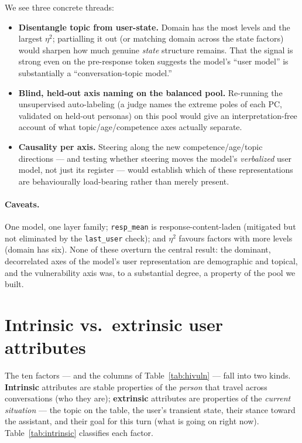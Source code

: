 \documentclass[11pt]{article}
\newcommand{\resp}{\texttt{resp\_mean}}
\newcommand{\lastu}{\texttt{last\_user}}
\begin{document}
We see three concrete threads:
\begin{itemize}\itemsep2pt
\item \textbf{Disentangle topic from user-state.} Domain has the most levels and
the largest $\eta^2$; partialling it out (or matching domain across the state
factors) would sharpen how much genuine \emph{state} structure remains. That the
signal is strong even on the pre-response token suggests the model's ``user model''
is substantially a ``conversation-topic model.''
\item \textbf{Blind, held-out axis naming on the balanced pool.} Re-running the
unsupervised auto-labeling (a judge names the extreme poles of each PC, validated on
held-out personas) on this pool would give an interpretation-free account of what
topic/age/competence axes actually separate.
\item \textbf{Causality per axis.} Steering along the new competence/age/topic
directions --- and testing whether steering moves the model's \emph{verbalized}
user model, not just its register --- would establish which of these representations
are behaviourally load-bearing rather than merely present.
\end{itemize}

\paragraph{Caveats.} One model, one layer family; \resp{} is response-content-laden
(mitigated but not eliminated by the \lastu{} check); and $\eta^2$ favours factors
with more levels (domain has six). None of these overturn the central result: the
dominant, decorrelated axes of the model's user representation are demographic and
topical, and the vulnerability axis was, to a substantial degree, a property of the
pool we built.

\appendix
\section{Intrinsic vs.\ extrinsic user attributes}
\label{app:intrinsic}
The ten factors --- and the columns of Table~\ref{tab:hivuln} --- fall into two kinds.
\textbf{Intrinsic} attributes are stable properties of the \emph{person} that travel
across conversations (who they are); \textbf{extrinsic} attributes are properties of
the \emph{current situation} --- the topic on the table, the user's transient state,
their stance toward the assistant, and their goal for this turn (what is going on right
now). Table~\ref{tab:intrinsic} classifies each factor.
\end{document}
